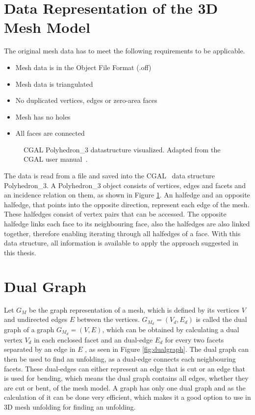 \documentclass[draft,final]{vutinfth} %
\begin{document}
\section{Data Representation of the 3D Mesh Model}
The original mesh data has to meet the following requirements to be applicable.

\begin{itemize}
	\item Mesh data is in the Object File Format (.off)
	\item Mesh data is triangulated
	\item No duplicated vertices, edges or zero-area faces
	\item Mesh has no holes
	\item All faces are connected
\end{itemize}

\begin{figure}

\caption{CGAL Polyhedron\_3 datastructure visualized. Adapted from the CGAL user manual~\cite{cgal:eb-19a}.}
\label{fig:cgal}
\end{figure}

The data is read from a file and saved into the CGAL~\cite{cgal:eb-19a} data structure Polyhedron\_3. A Polyhedron\_3 object consists of vertices, edges and facets and an incidence relation on them, as shown in Figure \ref{fig:cgal}. An halfedge and an opposite halfedge, that points into the opposite direction, represent each edge of the mesh. These halfedges consist of vertex pairs that can be accessed. The opposite halfedge links each face to its neighbouring face, also the halfedges are also linked together, therefore enabling iterating through all halfedges of a face. With this data structure, all information is available to apply the approach suggested in this thesis.

\section{Dual Graph}

Let $G_M$ be the graph representation of a mesh, which is defined by its vertices $V$ and undirected edges $E$ between the vertices. $G_{M_d} = (V_d, E_d)$ is called the dual graph of a graph $G_{M_d} = (V,E)$, which can be obtained by calculating a dual vertex $V_d$ in each enclosed facet and an dual-edge $E_d$ for every two facets separated by an edge in $E$ \cite{gross2004handbook}, as seen in Figure \ref{fig:dualgraph}. The dual graph can then be used to find an unfolding, as a dual-edge connects each neighbouring facets. These dual-edges can either represent an edge that is cut or an edge that is used for bending, which means the dual graph contains all edges, whether they are cut or bent, of the mesh model. A graph has only one dual graph and as the calculation of it can be done very efficient, which makes it a good option to use in 3D mesh unfolding for finding an unfolding.
\end{document}
